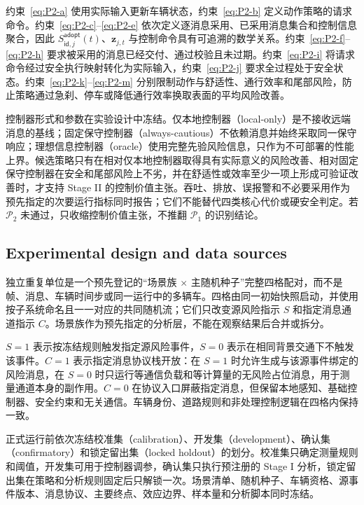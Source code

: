 \documentclass[10pt,a4paper,twocolumn]{article}
\begin{document}
约束~\eqref{eq:P2-a} 使用实际输入更新车辆状态，约束~\eqref{eq:P2-b} 定义动作策略的请求命令。约束~\eqref{eq:P2-c}--\eqref{eq:P2-e} 依次定义逐消息采用、已采用消息集合和控制信息聚合，因此 $S_{\mathsf{id},j}^{\mathsf{adopt}}(t)$、$\mathbf z_{j,t}$ 与控制命令具有可追溯的数学关系。约束~\eqref{eq:P2-f}--\eqref{eq:P2-h} 要求被采用的消息已经交付、通过校验且未过期。约束~\eqref{eq:P2-i} 将请求命令经过安全执行映射转化为实际输入，约束~\eqref{eq:P2-j} 要求全过程处于安全状态。约束~\eqref{eq:P2-k}--\eqref{eq:P2-m} 分别限制动作与舒适性、通行效率和尾部风险，防止策略通过急刹、停车或降低通行效率换取表面的平均风险改善。

控制器形式和参数在实验设计中冻结。仅本地控制器（local-only）是不接收远端消息的基线；固定保守控制器（always-cautious）不依赖消息并始终采取同一保守响应；理想信息控制器（oracle）使用完整先验风险信息，只作为不可部署的性能上界。候选策略只有在相对仅本地控制器取得具有实际意义的风险改善、相对固定保守控制器在安全和尾部风险上不劣，并在舒适性或效率至少一项上形成可验证改善时，才支持 Stage II 的控制价值主张。吞吐、排放、误报警和不必要采用作为预先指定的次要运行指标同时报告；它们不能替代四类核心代价或硬安全判定。若 $\mathcal P_2$ 未通过，只收缩控制价值主张，不推翻 $\mathcal P_1$ 的识别结论。

\subsection*{Experimental design and data sources}
独立重复单位是一个预先登记的“场景族 $\times$ 主随机种子”完整四格配对，而不是帧、消息、车辆时间步或同一运行中的多辆车。四格由同一初始快照启动，并使用按子系统命名且一一对应的共同随机流；它们只改变源风险指示 $S$ 和指定消息通道指示 $C$。场景族作为预先指定的分析层，不能在观察结果后合并或拆分。

$S=1$ 表示按冻结规则触发指定源风险事件，$S=0$ 表示在相同背景交通下不触发该事件。$C=1$ 表示指定消息协议栈开放：在 $S=1$ 时允许生成与该源事件绑定的风险消息，在 $S=0$ 时只运行等通信负载和等计算量的无风险占位消息，用于测量通道本身的副作用。$C=0$ 在协议入口屏蔽指定消息，但保留本地感知、基础控制器、安全约束和无关通信。车辆身份、道路规则和非处理控制逻辑在四格内保持一致。

正式运行前依次冻结校准集（calibration）、开发集（development）、确认集（confirmatory）和锁定留出集（locked holdout）的划分。校准集只确定测量规则和阈值，开发集可用于控制器调参，确认集只执行预注册的 Stage I 分析，锁定留出集在策略和分析规则固定后只解锁一次。场景清单、随机种子、车辆资格、源事件版本、消息协议、主要终点、效应边界、样本量和分析脚本同时冻结。
\end{document}
